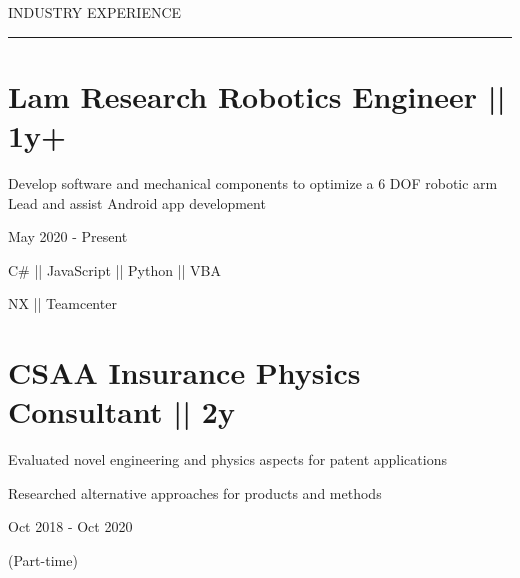 
{
\hspace{-1.72in}\noindent\color{cblue}

\vspace{1ex}
{INDUSTRY EXPERIENCE} %
}

\vspace{-6.6ex}
{\hspace{-1.73in}\noindent\color{dblue}\rule{6.935in}{0.4pt}} %
\vspace{-5ex}


\section
{\textbf{Lam Research}
\newline
Robotics Engineer || 1y+
\newline}{}

\vspace{-2.5ex}
\begin{detail}
\BulletItem
Develop software and mechanical components to optimize a 6 DOF robotic arm 
\BulletItem
Lead and assist Android app development
\end{detail}

\begin{subtitle}
\vspace{-7.8ex}
{{May 2020 - Present}} 
\end{subtitle}

{
\vspace{0.5ex}
\color{cyan}\small
{C\# || JavaScript || Python || VBA} %
}

{
\vspace{-2.5ex}\hspace{3.17in}
\color{cyan}\small
{NX || Teamcenter} %
}
\vspace{-3.0ex}

\section
{\textbf{CSAA Insurance}
\newline
Physics Consultant || 2y
\newline}


\begin{detail}
\vspace{-2.0ex}
\BulletItem
Evaluated novel engineering and physics aspects for patent applications

\BulletItem
Researched alternative approaches for products and methods
\end{detail}

\begin{subtitle}
\vspace{-7.8ex}
{{Oct 2018 - Oct 2020}} 
\end{subtitle}

\begin{subtitle}
\vspace{-2.0ex}
{{(Part-time)}} 
\end{subtitle}

